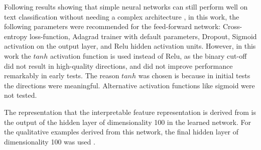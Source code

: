 Following results showing that simple neural networks can still perform well on text classification without needing a complex architecture  \cite{Lakhotia2018} \cite{Nam2014}, in this work, the following parameters were recommended for the feed-forward network: Cross-entropy loss-function, Adagrad trainer with default parameters, Dropout, Sigmoid activation on the output layer, and Relu hidden activation units. However, in this work the $tanh$ activation function is used instead of Relu, as the binary cut-off  did not result in high-quality directions, and did not improve performance remarkably in early tests. The reason $tanh$ was chosen is because in initial tests the directions were meaningful. Alternative activation functions  like sigmoid were not tested. %



  The representation that the interpretable feature representation is derived from is the output of the hidden layer of dimensionality 100 in the learned network. For the qualitative examples derived from this network,  the final hidden layer of dimensionality 100 was used .

